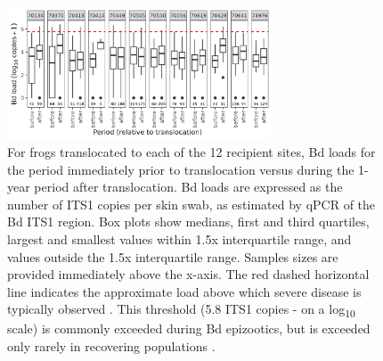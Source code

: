 \documentclass[9pt,twoside,lineno]{pnas-new-SI}
\begin{document}
\newpage

\begin{figure}

{\centering \includegraphics[width=0.7\textwidth]{figures/bdload_beforeafter.png}

}

\caption{\label{fig-bdload-beforeafter}For frogs translocated to each of
the 12 recipient sites, Bd loads for the period immediately prior to
translocation versus during the 1-year period after translocation. Bd
loads are expressed as the number of ITS1 copies per skin swab, as
estimated by qPCR of the Bd ITS1 region. Box plots show medians, first
and third quartiles, largest and smallest values within 1.5x
interquartile range, and values outside the 1.5x interquartile range.
Samples sizes are provided immediately above the x-axis. The red dashed
horizontal line indicates the approximate load above which severe
disease is typically observed \citep{vredenburg2010}. This threshold
(5.8 ITS1 copies - on a log\textsubscript{10} scale) is commonly
exceeded during Bd epizootics, but is exceeded only rarely in recovering
populations \citep{briggs2010}.}

\end{figure}\clearpage

\newpage
\end{document}
